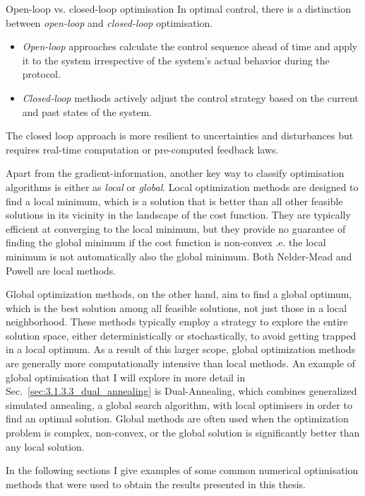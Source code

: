 \begin{mycolorbox}{{Open-loop vs. closed-loop optimisation}}
    In optimal control, there is a distinction between \emph{open-loop} and \emph{closed-loop} optimisation.
    \begin{itemize}
        \item \emph{Open-loop} approaches calculate the control sequence ahead of time and apply it to the system irrespective of the system's actual behavior during the protocol. 
        \item \emph{Closed-loop} methods actively adjust the control strategy based on the current and past states of the system.
    \end{itemize}
    The closed loop approach is more resilient to uncertainties and disturbances but requires real-time computation or pre-computed feedback laws.
\end{mycolorbox}

Apart from the gradient-information, another key way to classify optimisation algorithms is either as \emph{local} or \emph{global}. Local optimization methods are designed to find a local minimum, which is a solution that is better than all other feasible solutions in its vicinity in the landscape of the cost function. They are typically efficient at converging to the local minimum, but they provide no guarantee of finding the global minimum if the cost function is non-convex \@i.e. the local minimum is not automatically also the global minimum. Both Nelder-Mead and Powell are local methods.

Global optimization methods, on the other hand, aim to find a global optimum, which is the best solution among all feasible solutions, not just those in a local neighborhood. These methods typically employ a strategy to explore the entire solution space, either deterministically or stochastically, to avoid getting trapped in a local optimum. As a result of this larger scope, global optimization methods are generally more computationally intensive than local methods. An example of global optimisation that I will explore in more detail in Sec.~\ref{sec:3.1.3.3_dual_annealing} is Dual-Annealing, which combines generalized simulated annealing\cite{tsallis_generalized_1996}, a global search algorithm, with local optimisers in order to find an optimal solution. Global methods are often used when the optimization problem is complex, non-convex, or the global solution is significantly better than any local solution.

In the following sections I give examples of some common numerical optimisation methods that were used to obtain the results presented in this thesis.

